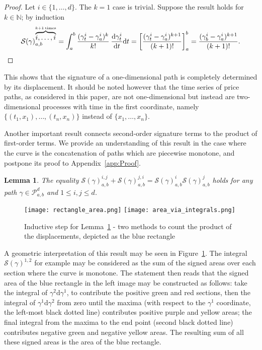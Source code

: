 \documentclass{amsart}[11pt]
\numberwithin{equation}{section}
\newtheorem{lemma}[theorem]{Lemma}
\theoremstyle{definition}
\newcommand{\Pp}{\mathcal{P}}
\newcommand{\Ss}{\mathcal{S}}
\newcommand{\NN}{\mathbb{N}}
\newcommand{\D}{\mathrm{d}}
\newcommand{\Pab}{\Pp_{a,b}^{d}}
\begin{document}
\begin{proof}
Let $i \in \{1, \ldots, d\}$. The $k = 1$ case is trivial. Suppose the result holds for $k \in \NN$; by induction
    \begin{equation*}
        \Ss(\gamma)^{\overbrace{i, \ldots, i}^{k+1 \hspace{0.15em} \rm{times}}}_{a, b} = \int_a^b \frac{(\gamma^i_t - \gamma^i_a)^k}{k!} \hspace{0.2em} \frac{\D \gamma^i_t}{\D t} \D{t} = \left[ \frac{(\gamma^i_t - \gamma^i_a)^{k+1}}{(k+1)!} \right]_a^b = \frac{(\gamma^i_b - \gamma^i_a)^{k+1}}{(k+1)!}.
    \end{equation*}
\end{proof}

This shows that the signature of a one-dimensional path is completely determined by its displacement. 
It should be noted however that the time series of price paths, as considered in this paper, are not one-dimensional but instead are two-dimensional processes with time in the first coordinate, 
namely
$\{(t_1, x_1), \ldots, (t_n, x_n)\}$ instead of $\{x_1, \ldots, x_n\}$.

Another important result connects second-order signature terms to the product of first-order terms. 
We provide an understanding of this result in the case where the curve is the concatenation of paths which are piecewise monotone, and postpone its proof to Appendix~\ref{app:Proof}.

\begin{lemma}\label{lem:sum-of-second-order-signature-terms}
The equality
$\Ss(\gamma)^{i, j}_{a, b} + \Ss(\gamma)^{j, i}_{a, b} = \Ss(\gamma)^i_{a,b} \Ss(\gamma)^j_{a,b}$
holds for any path $\gamma\in\Pab$ and $1\leq i,j \leq d$.
\end{lemma}

\begin{figure}[ht]
    \centering
        \texttt{[image: rectangle\_area.png]}
        \texttt{[image: area\_via\_integrals.png]}
    \caption{Inductive step for Lemma~\ref{lem:sum-of-second-order-signature-terms} - two methods to count the product of the displacements, depicted as the blue rectangle}
    \label{fig:area-via-integrals}
\end{figure}

A geometric interpretation of this result may be seen in Figure~\ref{fig:area-via-integrals}. The integral $\Ss(\gamma)^{1,2}$ for example may be considered as the sum of the signed areas over each section where the curve is monotone. 
The statement then reads that the signed area of the blue rectangle in the left image may be constructed as follows: take the integral of $\gamma^2 \D{\gamma^1}$, to contribute the positive green and red sections, then the integral of $\gamma^1 \D{\gamma^2}$ from zero until the maxima (with respect to the $\gamma^1$ coordinate, the left-most black dotted line) contributes positive purple and yellow areas; the final integral from the maxima to the end point (second black dotted line) contributes negative green and negative yellow areas. The resulting sum of all these signed areas is the area of the blue rectangle.
\end{document}

